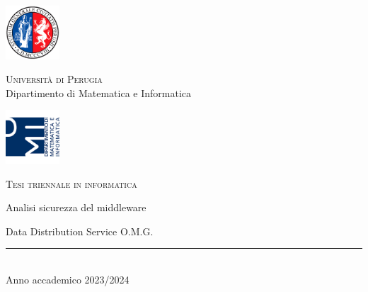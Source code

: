 \thispagestyle{empty} %

	\noindent %
	\includegraphics[width=0.15\textwidth]{img/logoUniPg}
	\begin{minipage}[b]{0.7\textwidth}
		\centering
		{\Large \textcolor{blu_dmi}{\textsc{Universit{\`a} di Perugia}}}\\
		\vspace{0.4 em}
		{\large \textcolor{blu_dmi}{Dipartimento di Matematica e Informatica}}
		\vspace{0.6 em}
	\end{minipage}%
	\includegraphics[width=0.15\textwidth]{img/logoDMI}
	
	\vspace{5 em}

	\begin{center}
		
		{\large \textcolor{blu_dmi}{\textsc{Tesi triennale in informatica}}}
		\vspace{8 em}
		
		{\Huge \textcolor{blu_dmi}{Analisi sicurezza del middleware}}
		\vspace{1.5 em}

		{\Huge \textcolor{blu_dmi}{Data Distribution Service O.M.G.}}
		
		\vspace{10 em}
		
		
		\vspace{6 em}
		\vfill
		
		\textcolor{blu_dmi}{\rule{380pt}{.4pt}}\\
		\vspace{1.2 em}
		\large{\textcolor{blu_dmi}{Anno accademico 2023/2024}}
		
		
		
		
	\end{center}


